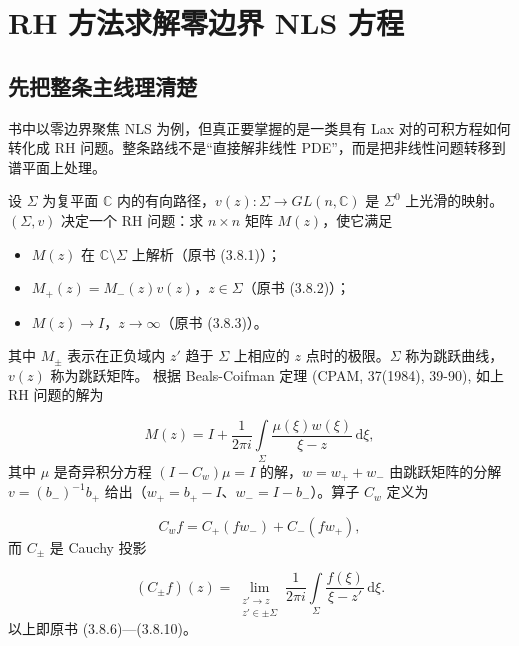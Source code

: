 \documentclass[
    lang=cn,
    scheme=chinese,
    mode=simple,
    device=normal,
    color=blue,
    math=cm,
    thmcnt=section,
    12pt
]{elegantbook}
\begin{document}
\setcounter{chapter}{4}

\chapter{RH 方法求解零边界 NLS 方程}

\section*{先把整条主线理清楚}

书中以零边界聚焦 NLS 为例，但真正要掌握的是一类具有 Lax 对的可积方程如何转化成 RH 问题。整条路线不是``直接解非线性 PDE''，而是把非线性问题转移到谱平面上处理。

\begin{callout}
    设 $\Sigma$ 为复平面 $\mathbb{C}$ 内的有向路径，$v(z):\Sigma\to GL(n,\mathbb{C})$ 是 $\Sigma^0$ 上光滑的映射。
    $(\Sigma,v)$ 决定一个 RH 问题：求 $n\times n$ 矩阵 $M(z)$，使它满足

    \begin{itemize}
        \item $M(z)$ 在 $\mathbb{C}\setminus\Sigma$ 上解析（原书 (3.8.1)）；
        \item $M_+(z)=M_-(z)v(z)$，$z\in\Sigma$（原书 (3.8.2)）；
        \item $M(z)\to I$，$z\to\infty$（原书 (3.8.3)）。
    \end{itemize}

    其中 $M_\pm$ 表示在正负域内 $z'$ 趋于 $\Sigma$ 上相应的 $z$ 点时的极限。$\Sigma$ 称为跳跃曲线，$v(z)$ 称为跳跃矩阵。
    根据 Beals-Coifman 定理 (CPAM, 37(1984), 39-90), 如上 RH 问题的解为

    \[
        M(z)
        =
        I+\dfrac{1}{2\pi i}\int\limits_\Sigma\dfrac{\mu(\xi)w(\xi)}{\xi-z}\,\mathrm d\xi,
    \]
    其中 $\mu$ 是奇异积分方程 $(I-C_w)\mu=I$ 的解，$w=w_++w_-$ 由跳跃矩阵的分解 $v=(b_-)^{-1}b_+$ 给出（$w_+=b_+-I$、$w_-=I-b_-$）。算子 $C_w$ 定义为

    \[
        C_wf=C_+(fw_-)+C_-(fw_+),
    \]
    而 $C_\pm$ 是 Cauchy 投影

    \[
        (C_\pm f)(z)=\lim\limits_{\substack{z'\to z\\ z'\in\pm\Sigma}}\dfrac{1}{2\pi i}\int\limits_\Sigma\dfrac{f(\xi)}{\xi-z'}\,\mathrm d\xi.
    \]
    以上即原书 (3.8.6)---(3.8.10)。
\end{callout}
\end{document}
